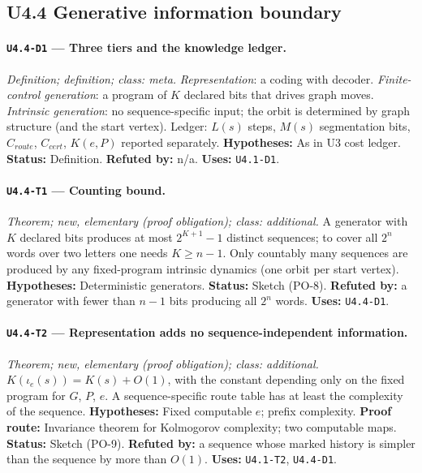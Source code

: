 \documentclass[11pt]{article}
\begin{document}
\subsection{U4.4 Generative information boundary}
\paragraph{\texttt{U4.4-D1} --- Three tiers and the knowledge ledger.} \emph{Definition; definition; class: meta.} \emph{Representation}: a coding with decoder. \emph{Finite-control generation}: a program of $K$ declared bits that drives graph moves. \emph{Intrinsic generation}: no sequence-specific input; the orbit is determined by graph structure (and the start vertex). Ledger: $L(s)$ steps, $M(s)$ segmentation bits, $C_{route}$, $C_{cert}$, $K(e,P)$ reported separately. \textbf{Hypotheses:} As in U3 cost ledger. \textbf{Status:} Definition. \textbf{Refuted by:} n/a. \textbf{Uses:} \texttt{U4.1-D1}.

\paragraph{\texttt{U4.4-T1} --- Counting bound.} \emph{Theorem; new, elementary (proof obligation); class: additional.} A generator with $K$ declared bits produces at most $2^{K+1}-1$ distinct sequences; to cover all $2^n$ words over two letters one needs $K\ge n-1$. Only countably many sequences are produced by any fixed-program intrinsic dynamics (one orbit per start vertex). \textbf{Hypotheses:} Deterministic generators. \textbf{Status:} Sketch (PO-8). \textbf{Refuted by:} a generator with fewer than $n-1$ bits producing all $2^n$ words. \textbf{Uses:} \texttt{U4.4-D1}.

\paragraph{\texttt{U4.4-T2} --- Representation adds no sequence-independent information.} \emph{Theorem; new, elementary (proof obligation); class: additional.} $K(\iota_e(s))=K(s)+O(1)$, with the constant depending only on the fixed program for $G$, $P$, $e$. A sequence-specific route table has at least the complexity of the sequence. \textbf{Hypotheses:} Fixed computable $e$; prefix complexity. \textbf{Proof route:} Invariance theorem for Kolmogorov complexity; two computable maps. \textbf{Status:} Sketch (PO-9). \textbf{Refuted by:} a sequence whose marked history is simpler than the sequence by more than $O(1)$. \textbf{Uses:} \texttt{U4.1-T2}, \texttt{U4.4-D1}.
\end{document}
